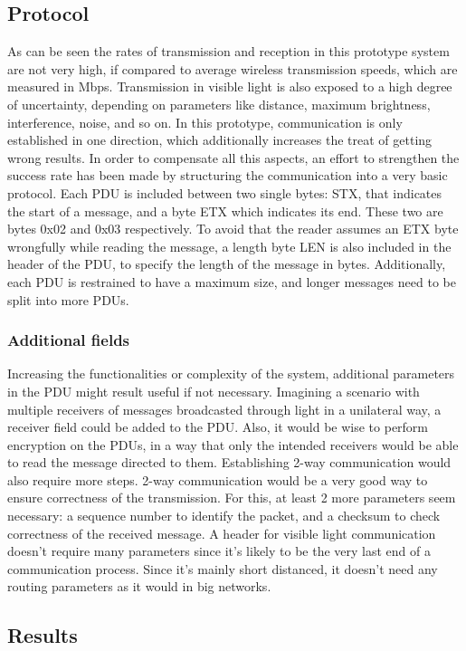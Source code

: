 \subsection{Protocol}
As can be seen the rates of transmission and reception in this prototype system are not very high, if compared to average wireless transmission speeds, which are measured in Mbps.
Transmission in visible light is also exposed to a high degree of uncertainty, depending on parameters like distance, maximum brightness, interference, noise, and so on.
In this prototype, communication is only established in one direction, which additionally increases the treat of getting wrong results.
In order to compensate all this aspects, an effort to strengthen the success rate has been made by structuring the communication into a very basic protocol.
Each PDU is included between two single bytes: STX, that indicates the start of a message, and a byte ETX which indicates its end. These two are bytes 0x02 and 0x03 respectively. To avoid that the reader assumes an ETX byte wrongfully while reading the message, a length byte LEN is also included in the header of the PDU, to specify the length of the message in bytes.
Additionally, each PDU is restrained to have a maximum size, and longer messages need to be split into more PDUs.

\subsubsection{Additional fields}
Increasing the functionalities or complexity of the system, additional parameters in the PDU might result useful if not necessary. 
Imagining a scenario with multiple receivers of messages broadcasted through light in a unilateral way, a receiver field could be added to the PDU. Also, it would be wise to perform encryption on the PDUs, in a way that only the intended receivers would be able to read the message directed to them.
Establishing 2-way communication would also require more steps. 2-way communication would be a very good way to ensure correctness of the transmission. For this, at least 2 more parameters seem necessary: a sequence number to identify the packet, and a checksum to check correctness of the received message.
A header for visible light communication doesn't require many parameters since it's likely to be the very last end of a communication process. Since it's mainly short distanced, it doesn't need any routing parameters as it would in big networks. 


\subsection{Results}

